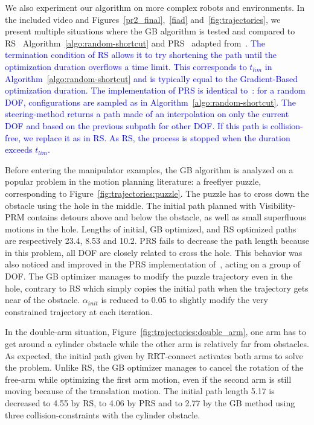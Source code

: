\documentclass{tADR2e}
\newcommand\conf{\mathbf{q}}
\begin{document}
We also experiment our algorithm on more complex robots and environments.
In the included video and Figures~\ref{pr2_final},~\ref{fiad} 
and~\ref{fig:trajectories}, we present multiple situations where the GB algorithm 
is tested and compared to RS~\cite{randomShortcutHPP}
Algorithm~\ref{algo:random-shortcut} and PRS~\cite{partialrandomShortcutHPP} 
adapted from~\cite{GeraertsIJRR07}.
\textcolor{blue}{
The termination condition of RS allows it to try 
shortening the path until the optimization duration overflows a time limit. 
This corresponds to $t_{lim}$ in Algorithm~\ref{algo:random-shortcut} and is typically equal to the Gradient-Based optimization duration.
The implementation of PRS is identical to~\cite{GeraertsIJRR07}:
for a random DOF, configurations are sampled as in 
Algorithm~\ref{algo:random-shortcut}. The steering-method returns a path made of 
an interpolation on only 
the current DOF and based on the previous subpath for other DOF. If this path is 
collision-free, we replace it as in RS. As RS, the process is stopped when the duration exceeds $t_{lim}$.
}

\vspace{0.4cm}
Before entering the manipulator examples, the GB algorithm is analyzed 
on a popular problem in the motion planning literature: a freeflyer puzzle, 
corresponding to Figure~\ref{fig:trajectories:puzzle}. The 
puzzle has to cross down the 
obstacle using the hole in the middle. The initial path planned with Visibility-PRM 
contains detours above and below the obstacle, as well as small superfluous
motions in the hole. 
Lengths of initial, GB optimized, and RS optimized paths are 
respectively 23.4, 8.53 and 10.2. PRS fails to decrease the path length because in 
this problem, all DOF are closely related to cross the hole. This behavior was also 
noticed and improved in the PRS implementation of~\cite{GeraertsIJRR07}, 
acting on a group of DOF. The GB optimizer manages to modify the puzzle trajectory 
even in the hole, contrary to RS which simply copies the initial path when the 
trajectory gets near of the obstacle. $\alpha_{init}$ is reduced to 0.05 to slightly modify the very constrained trajectory at each iteration.

\vspace{0.4cm}

In the double-arm situation, Figure~\ref{fig:trajectories:double_arm}, one arm has 
to get around a cylinder obstacle while the 
other arm is relatively far from obstacles. As expected, the initial path given by 
RRT-connect activates both arms to solve the problem. Unlike RS, 
the GB optimizer manages to cancel the rotation of the free-arm while optimizing the 
first arm motion, even if the second arm is still moving because of the translation 
motion. The initial path length 5.17 is decreased to 4.55 by RS, to 4.06 by PRS and 
to 2.77 by the GB method using three collision-constraints with the cylinder obstacle.
\end{document}
